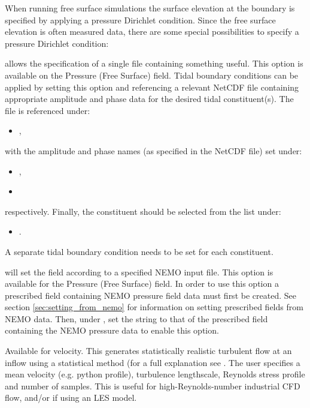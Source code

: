 When running free surface simulations the surface elevation at the boundary is specified by applying a pressure Dirichlet condition. Since the free surface elevation is often measured data, there are some special possibilities to specify a pressure Dirichlet condition: 

 allows the specification of a single file
containing something useful. This option is available on the Pressure (Free
Surface) field. Tidal boundary conditions can be applied by setting this option
and referencing a relevant NetCDF file containing appropriate amplitude and phase data for the desired
tidal constituent(s). The file is referenced under:
\begin{itemize}
\item {},
\end{itemize}
with the amplitude and phase names (as specified in the NetCDF file) set under:
\begin{itemize}
\item {},
\item {}
\end{itemize}
respectively. Finally, the constituent should be selected from the list under:
\begin{itemize}
\item {}.
\end{itemize}
A separate tidal boundary condition needs to be set for each constituent.

 will set the field according to a specified NEMO
input file. This option is available for the Pressure (Free Surface) field.
In order to use this option a prescribed field containing NEMO pressure
field data must first be created. See section \ref{sec:setting_from_nemo}
for information on setting prescribed fields from NEMO data. Then, under
, set the string to that of the prescribed
field containing the NEMO pressure data to enable this option.

 Available for velocity.
This generates statistically realistic turbulent flow at an inflow using a
statistical method (for a full explanation see \cite{jarrin_06}.
The user specifies a mean velocity (e.g. python profile),
turbulence lengthscale, Reynolds stress profile and number of samples.
This is useful for high-Reynolds-number industrial CFD flow, and/or if using an LES model.

